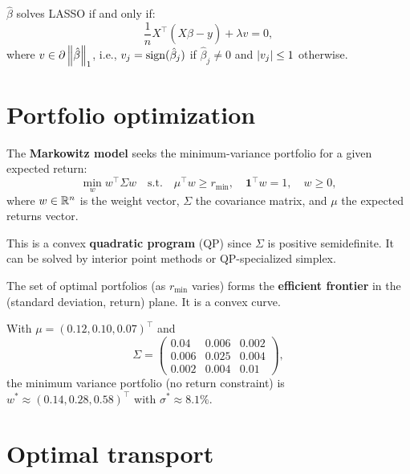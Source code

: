 \begin{theorem}
$\hat{\beta}$ solves LASSO if and only if:
\[
  \frac{1}{n} X^\top(X\hat{\beta} - y) + \lambda v = 0,
\]
where $v \in \partial \left\| \hat{\beta} \right\|_1$, i.e.,
$v_j = \mathrm{sign}(\hat{\beta}_j)$ if $\hat{\beta}_j \ne 0$ and
$\left| v_j \right| \leq 1$ otherwise.
\end{theorem}

\section{Portfolio optimization}

\begin{definition}
The \textbf{Markowitz model} seeks the minimum-variance portfolio for a given
expected return:
\[
  \min_w w^\top \Sigma w \quad \text{s.t.} \quad
  \mu^\top w \geq r_{\min}, \quad
  \mathbf{1}^\top w = 1, \quad w \geq 0,
\]
where $w \in \mathbb{R}^n$ is the weight vector, $\Sigma$ the covariance matrix, and
$\mu$ the expected returns vector.
\end{definition}

\begin{remark}
This is a convex \textbf{quadratic program} (QP) since $\Sigma$ is positive
semidefinite. It can be solved by interior point methods or QP-specialized
simplex.
\end{remark}

\begin{proposition}
The set of optimal portfolios (as $r_{\min}$ varies) forms the
\textbf{efficient frontier} in the (standard deviation, return) plane. It is a
convex curve.
\end{proposition}

\begin{example}
With $\mu = (0.12, 0.10, 0.07)^\top$ and
\[
  \Sigma = \begin{pmatrix}
    0.04 & 0.006 & 0.002 \\
    0.006 & 0.025 & 0.004 \\
    0.002 & 0.004 & 0.01
  \end{pmatrix},
\]
the minimum variance portfolio (no return constraint) is
$w^* \approx (0.14, 0.28, 0.58)^\top$ with $\sigma^* \approx 8.1\%$.
\end{example}

\section{Optimal transport}

